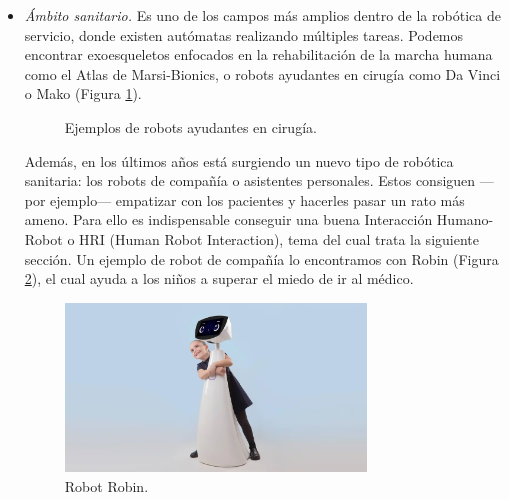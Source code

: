 \begin{itemize}
\item \textit{Ámbito sanitario.} Es uno de los campos más amplios dentro de la robótica de servicio, donde existen autómatas realizando múltiples tareas. Podemos encontrar exoesqueletos enfocados en la rehabilitación de la marcha humana como el Atlas de Marsi-Bionics, o robots ayudantes en cirugía como Da Vinci o Mako (Figura \ref{fig:robots_cirugia}).

\begin{figure}[h!]
  \begin{center}
    \subcapcentertrue
  \end{center}
\caption{Ejemplos de robots ayudantes en cirugía.}
\label{fig:robots_cirugia}
\end{figure}

Además, en los últimos años está surgiendo un nuevo tipo de robótica sanitaria: los robots de compañía o asistentes personales. Estos consiguen ---por ejemplo--- empatizar con los pacientes y hacerles pasar un rato más ameno. Para ello es indispensable conseguir una buena Interacción Humano-Robot o HRI (Human Robot Interaction), tema del cual trata la siguiente sección. Un ejemplo de robot de compañía lo encontramos con Robin (Figura \ref{fig:robin}), el cual ayuda a los niños a superar el miedo de ir al médico.

\begin{figure} [h!]
  \begin{center}
    \includegraphics[width=8cm]{figs/robin.png}
  \end{center}
  \caption{Robot Robin.}
  \label{fig:robin}
\end{figure}
\end{itemize}

